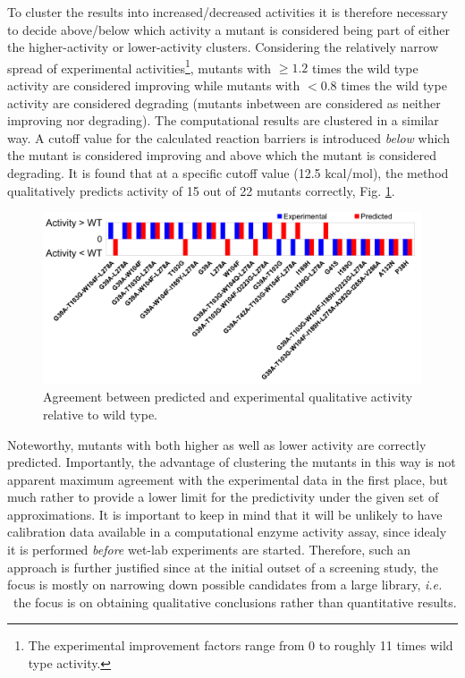 To cluster the results into increased/decreased activities it is therefore necessary to decide above/below which activity a mutant is considered being part of either the higher-activity or lower-activity clusters.
Considering the relatively narrow spread of experimental activities\footnote{The experimental improvement factors range from 0 to roughly 11 times wild type activity.}, mutants with $\geq1.2$ times the wild type activity are considered improving while mutants with $<0.8$ times the wild type activity are considered degrading (mutants inbetween are considered as neither improving nor degrading)\cite{hediger2013silico}.
The computational results are clustered in a similar way.
A cutoff value for the calculated reaction barriers is introduced \textit{below} which the mutant is considered improving and above which the mutant is considered degrading.
It is found that at a specific cutoff value (12.5 kcal/mol), the method qualitatively predicts activity of 15 out of 22 mutants correctly, Fig. \ref{fig:diag-predictivity}.
\begin{figure}[htbp] 
\includegraphics[width=1.00\linewidth]{diag-predictivity-truncated.pdf}
\caption{
Agreement between predicted and experimental qualitative activity relative to wild type\cite{hediger2013silico}.
}
\label{fig:diag-predictivity}
\end{figure}
Noteworthy, mutants with both higher as well as lower activity are correctly predicted.
Importantly, the advantage of clustering the mutants in this way is not apparent maximum agreement with the experimental data in the first place, but much rather to provide a lower limit for the predictivity under the given set of approximations.
It is important to keep in mind that it will be unlikely to have calibration data available in a computational enzyme activity assay, since idealy it is performed \textit{before} wet-lab experiments are started.
Therefore, such an approach is further justified since at the initial outset of a screening study, the focus is mostly on narrowing down possible candidates from a large library, \textit{i.e. } the focus is on obtaining qualitative conclusions rather than quantitative results\cite{agresti2010ultrahigh}.
